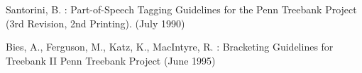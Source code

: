 \documentclass{llncs}
\begin{document}
\newpage
%
%
\begin{thebibliography}{}
%
Santorini, B. :
Part-of-Speech Tagging Guidelines for the
Penn Treebank Project (3rd Revision, 2nd Printing).
(July 1990)

Bies, A., Ferguson, M., Katz, K., MacIntyre, R. :
Bracketing Guidelines for Treebank II
Penn Treebank Project
(June 1995)

\end{thebibliography}
\clearpage
{} %
\renewcommand{\indexname}{Author Index}
\printindex
\clearpage
{} %
\renewcommand{\indexname}{Subject Index}

\end{document}
